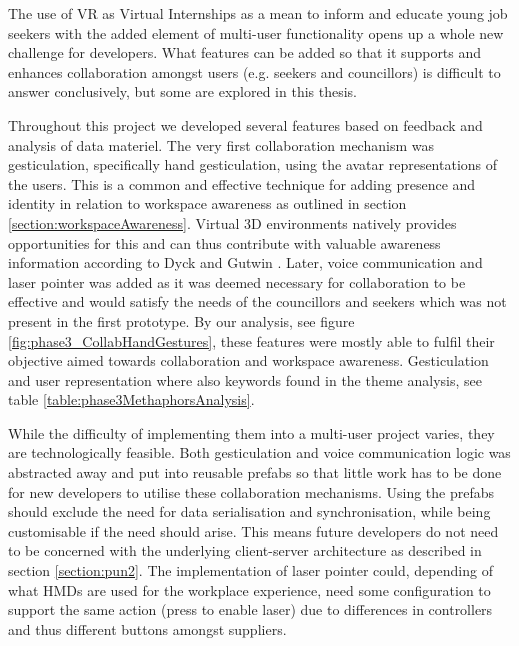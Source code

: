 The use of VR as Virtual Internships as a mean to inform and educate young job seekers with the added element of multi-user functionality opens up a whole new challenge for developers. What features can be added so that it supports and enhances collaboration amongst users (e.g. seekers and councillors) is difficult to answer conclusively, but some are explored in this thesis.

Throughout this project we developed several features based on feedback and analysis of data materiel. The very first collaboration mechanism was gesticulation, specifically hand gesticulation, using the avatar representations of the users. This is a common and effective technique for adding presence and identity in relation to workspace awareness as outlined in section \ref{section:workspaceAwareness}. Virtual 3D environments natively provides opportunities for this and can thus contribute with valuable awareness information according to Dyck
and Gutwin \cite{dyck2002groupspace}. Later, voice communication and laser pointer was added as it was deemed necessary for collaboration to be effective and would satisfy the needs of the councillors and seekers which was not present in the first prototype. By our analysis, see figure \ref{fig:phase3_CollabHandGestures}, these features were mostly able to fulfil their objective aimed towards collaboration and workspace awareness. Gesticulation and user representation where also keywords found in the theme analysis, see table \ref{table:phase3MethaphorsAnalysis}.

While the difficulty of implementing them into a multi-user project varies, they are technologically feasible. Both gesticulation and voice communication logic was abstracted away and put into reusable prefabs so that little work has to be done for new developers to utilise these collaboration mechanisms. Using the prefabs should exclude the need for data serialisation and synchronisation, while being customisable if the need should arise. This means future developers do not need to be concerned with the underlying client-server architecture as described in section \ref{section:pun2}.
The implementation of laser pointer could, depending of what HMDs are used for the workplace experience, need some configuration to support the same action (press to enable laser) due to differences in controllers and thus different buttons amongst suppliers.  

